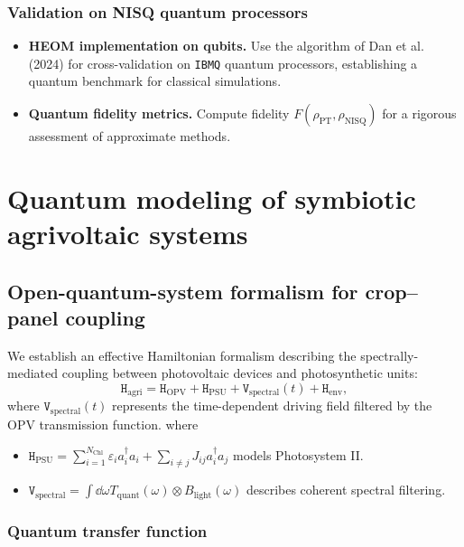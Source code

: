 \documentclass[12pt, a4paper]{article}
\begin{document}
\subsubsection{Validation on NISQ quantum processors}

\begin{itemize}
    \item \textbf{HEOM implementation on qubits.} Use the algorithm of Dan et al. (2024) for cross-validation on \texttt{IBMQ} quantum processors, establishing a quantum benchmark for classical simulations.
    
    \item \textbf{Quantum fidelity metrics.} Compute fidelity $F(\rho_{\text{PT}}, \rho_{\text{NISQ}})$ for a rigorous assessment of approximate methods.
\end{itemize}

\section{Quantum modeling of symbiotic agrivoltaic systems}
\label{sec:quantum_modeling}

\subsection{Open-quantum-system formalism for crop–panel coupling}

We establish an effective Hamiltonian formalism describing the spectrally-mediated coupling between photovoltaic devices and photosynthetic units:
\begin{equation}
\label{eq:agri_hamiltonian}
\mathtt{H}_{\text{agri}} = \mathtt{H}_{\text{OPV}} + \mathtt{H}_{\text{PSU}} + \mathtt{V}_{\text{spectral}}(t) + \mathtt{H}_{\text{env}},
\end{equation}
where $\mathtt{V}_{\text{spectral}}(t)$ represents the time-dependent driving field filtered by the OPV transmission function.
where
\begin{itemize}
    \item $\mathtt{H}_{\text{PSU}} = \sum_{i=1}^{N_{\text{Chl}}} \varepsilon_i a_i^\dagger a_i + \sum_{i\neq j} J_{ij} a_i^\dagger a_j$ models Photosystem II.

    \item $\mathtt{V}_{\text{spectral}} = \int \dd{\omega} T_{\text{quant}}(\omega) \otimes B_{\text{light}}(\omega)$ describes coherent spectral filtering.
\end{itemize}

\subsubsection{Quantum transfer function}
\end{document}
